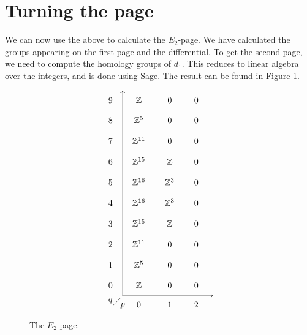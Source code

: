 \section{Turning the page}
\label{sec:rand}

We can now use the above to calculate the $E_2$-page. We have
calculated the groups appearing on the first page and the
differential. To get the second page, we need to compute the homology
groups of $d_1$. This reduces to linear algebra over the integers, and
is done using Sage. The result can be found in Figure \ref{fig:e2}.

\begin{figure}[ht]
  \[ \xy
  (5,4); (5,-80); **\dir{-}; (5,4); *\dir{>};
  (5,-80); (42,-80); **\dir{-}; *\dir{<};
  (0,-82)*{q}; (5,-84)*{p};
  (1,-84); (4,-81); **\dir{-};
  (0,0)\xymatrix@R=1em@C=1.7em{
    9 & \Z & 0 & 0 \\
    8 & \Z^5 & 0 & 0 \\
    7 & \Z^{11} & 0 & 0 \\
    6 & \Z^{15} & \Z & 0 \\
    5 & \Z^{16} & \Z^{3} & 0 \\
    4 & \Z^{16} & \Z^{3} & 0 \\
    3 & \Z^{15} & \Z & 0 \\
    2 & \Z^{11} & 0 & 0 \\
    1 & \Z^{5} & 0 & 0 \\
    0 & \Z & 0 & 0 \\
    & 0 & 1 & 2
  } \endxy \]
  \caption{The $E_2$-page.}
  \label{fig:e2}
\end{figure}

